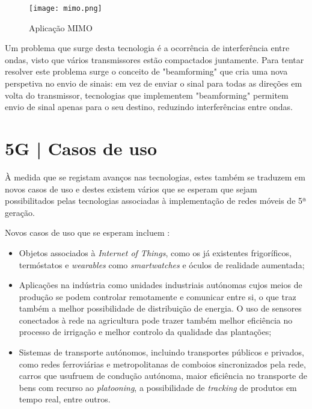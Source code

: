 \documentclass{llncs}
\begin{document}
\begin{figure}
    \centering
    \texttt{[image: mimo.png]}
    \caption{Aplicação MIMO \cite{MIMO}}
\end{figure}

\hspace*{1.5em} Um problema que surge desta tecnologia é a ocorrência de interferência entre ondas, visto que vários transmissores estão compactados juntamente. Para tentar resolver este problema surge o conceito de "beamforming" que cria uma nova perspetiva no envio de sinais: em vez de enviar o sinal para todas as direções em volta do transmissor, tecnologias que implementem "beamforming" permitem envio de sinal apenas para o seu destino, reduzindo interferências entre ondas.

\section{5G | Casos de uso }

À medida que se registam avanços nas tecnologias, estes também se traduzem em novos casos de uso e destes existem vários que se esperam que sejam possibilitados pelas tecnologias associadas à implementação de redes móveis de 5ª geração.

Novos casos de uso que se esperam incluem :
\begin{itemize}
    \item Objetos associados à \textit{Internet of Things}, como os já existentes frigoríficos, termóstatos e \textit{wearables} como \textit{smartwatches} e óculos de realidade aumentada;
    \item Aplicações na indústria como unidades industriais autónomas cujos meios de produção se podem controlar remotamente e comunicar entre si, o que traz também a melhor possibilidade de distribuição de energia. O uso de sensores conectados à rede na agricultura pode trazer também melhor eficiência no processo de irrigação e melhor controlo da qualidade das plantações;
    \item Sistemas de transporte autónomos, incluindo transportes públicos e privados, como redes ferroviárias e metropolitanas de comboios sincronizados pela rede, carros que usufruem de condução autónoma, maior eficiência no transporte de bens com recurso ao \textit{platooning}, a possibilidade de \textit{tracking} de produtos em tempo real, entre outros.
\end{itemize}
\end{document}
